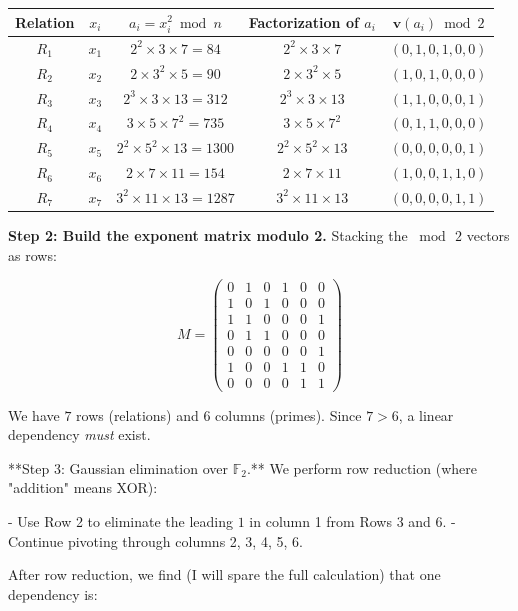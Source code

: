 \documentclass[12pt, letterpaper, openany]{book}
\theoremstyle{definition}
\theoremstyle{remark}
\begin{document}
\begin{center}
\begin{tabular}{|c|c|c|c|c|}
\hline
Relation & $x_i$ & $a_i = x_i^2 \bmod n$ & Factorization of $a_i$ & $\mathbf{v}(a_i) \bmod 2$ \\
\hline
$R_1$ & $x_1$ & $2^2 \times 3 \times 7 = 84$ & $2^2 \times 3 \times 7$ & $(0, 1, 0, 1, 0, 0)$ \\
$R_2$ & $x_2$ & $2 \times 3^2 \times 5 = 90$ & $2 \times 3^2 \times 5$ & $(1, 0, 1, 0, 0, 0)$ \\
$R_3$ & $x_3$ & $2^3 \times 3 \times 13 = 312$ & $2^3 \times 3 \times 13$ & $(1, 1, 0, 0, 0, 1)$ \\
$R_4$ & $x_4$ & $3 \times 5 \times 7^2 = 735$ & $3 \times 5 \times 7^2$ & $(0, 1, 1, 0, 0, 0)$ \\
$R_5$ & $x_5$ & $2^2 \times 5^2 \times 13 = 1300$ & $2^2 \times 5^2 \times 13$ & $(0, 0, 0, 0, 0, 1)$ \\
$R_6$ & $x_6$ & $2 \times 7 \times 11 = 154$ & $2 \times 7 \times 11$ & $(1, 0, 0, 1, 1, 0)$ \\
$R_7$ & $x_7$ & $3^2 \times 11 \times 13 = 1287$ & $3^2 \times 11 \times 13$ & $(0, 0, 0, 0, 1, 1)$ \\
\hline
\end{tabular}
\end{center}


\textbf{Step 2: Build the exponent matrix modulo 2.} Stacking the $\bmod\, 2$ vectors as rows:

\[
M = \begin{pmatrix} 0 & 1 & 0 & 1 & 0 & 0 \\ 1 & 0 & 1 & 0 & 0 & 0 \\ 1 & 1 & 0 & 0 & 0 & 1 \\ 0 & 1 & 1 & 0 & 0 & 0 \\ 0 & 0 & 0 & 0 & 0 & 1 \\ 1 & 0 & 0 & 1 & 1 & 0 \\ 0 & 0 & 0 & 0 & 1 & 1 \end{pmatrix}
\]

We have $7$ rows (relations) and $6$ columns (primes). Since $7 > 6$, a linear dependency \textit{must} exist.

**Step 3: Gaussian elimination over $\mathbb{F}_2$.** We perform row reduction (where "addition" means XOR):

- Use Row 2 to eliminate the leading $1$ in column 1 from Rows 3 and 6.
- Continue pivoting through columns 2, 3, 4, 5, 6.

After row reduction, we find (I will spare the full calculation) that one dependency is:
\end{document}
